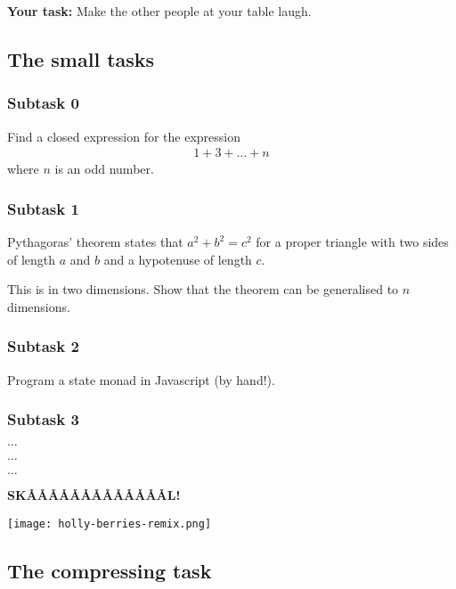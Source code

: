 \textbf{Your task:} Make the other people at your table laugh.

\newpage

\subsection{The small tasks}

\subsubsection{Subtask 0}

Find a closed expression for the expression
\begin{align*}
1 + 3 + \ldots + n
\end{align*}
where $n$ is an odd number.


\subsubsection{Subtask 1}

Pythagoras' theorem states that $a^2 + b^2 = c^2$ for a proper triangle with two
sides of length $a$ and $b$ and a hypotenuse of length $c$.

This is in two dimensions.  Show that the theorem can be generalised to $n$
dimensions.


\subsubsection{Subtask 2}

Program a state monad in Javascript (by hand!).


\subsubsection{Subtask 3}

$\ldots$

$\ldots$

$\ldots$

\textbf{SKÅÅÅÅÅÅÅÅÅÅÅÅÅL!}

\begin{center}
\texttt{[image: holly-berries-remix.png]}
\end{center}


\newpage

\subsection{The compressing task}

